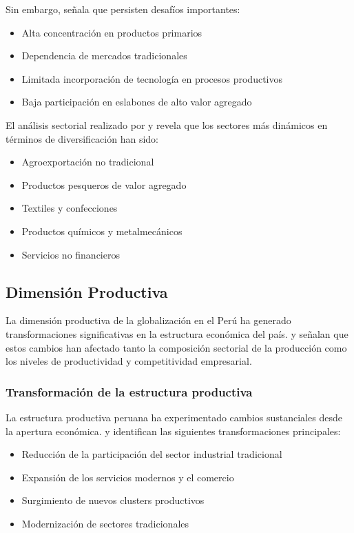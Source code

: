 \documentclass[12pt, a4paper]{article}
\begin{document}
Sin embargo, \cite{fairlie2020} señala que persisten desafíos importantes:
\begin{itemize}
    \item Alta concentración en productos primarios
    \item Dependencia de mercados tradicionales
    \item Limitada incorporación de tecnología en procesos productivos
    \item Baja participación en eslabones de alto valor agregado
\end{itemize}

El análisis sectorial realizado por \cite{lopez2019} y \cite{sanchez2020} revela que los sectores más dinámicos en términos de diversificación han sido:
\begin{itemize}
    \item Agroexportación no tradicional
    \item Productos pesqueros de valor agregado
    \item Textiles y confecciones
    \item Productos químicos y metalmecánicos
    \item Servicios no financieros
\end{itemize}

\subsection{Dimensión Productiva}

La dimensión productiva de la globalización en el Perú ha generado transformaciones significativas en la estructura económica del país. \cite{tavara2020} y \cite{cespedes2019} señalan que estos cambios han afectado tanto la composición sectorial de la producción como los niveles de productividad y competitividad empresarial.

\subsubsection{Transformación de la estructura productiva}
La estructura productiva peruana ha experimentado cambios sustanciales desde la apertura económica. \cite{jimenez2021} y \cite{vera2018} identifican las siguientes transformaciones principales:

\begin{itemize}
    \item Reducción de la participación del sector industrial tradicional
    \item Expansión de los servicios modernos y el comercio
    \item Surgimiento de nuevos clusters productivos
    \item Modernización de sectores tradicionales
\end{itemize}
\end{document}
